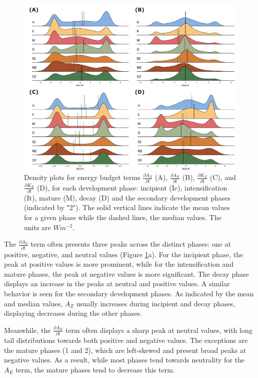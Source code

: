 \begin{figure}[!htbp]
\centering
\includegraphics[width=\textwidth]{figs_5/ridge_plot_Budget Terms.pdf}
\caption[Density Plots - Energy Terms]{Density plots for energy budget terms $\frac{\partial A_Z}{\partial t}$ (A), $\frac{\partial A_E}{\partial t}$ (B), $\frac{\partial K_Z}{\partial t}$ (C), and $\frac{\partial K_E}{\partial t}$ (D), for each development phase: incipient (Ic), intensification (It), mature (M), decay (D) and the secondary development phases (indicated by "2"). The solid vertical lines indicate the mean values for a given phase while the dashed lines, the median values. The units are $W m^{-2}$.}
\label{fig:ridge_plot_Budget}
\end{figure}

The $\frac{\partial A_Z}{\partial t}$ term often presents three peaks across the distinct phases: one at positive, negative, and neutral values (Figure \ref{fig:ridge_plot_Budget}a). For the incipient phase, the peak at positive values is more prominent, while for the intensification and mature phases, the peak at negative values is more significant. The decay phase displays an increase in the peaks at neutral and positive values. A similar behavior is seen for the secondary development phases. As indicated by the mean and median values, $A_Z$ usually increases during incipient and decay phases, displaying decreases during the other phases.

Meanwhile, the $\frac{\partial A_E}{\partial t}$ term often displays a sharp peak at neutral values, with long tail distributions towards both positive and negative values. The exceptions are the mature phases (1 and 2), which are left-skewed and present broad peaks at negative values. As a result, while most phases tend towards neutrality for the $A_E$ term, the mature phases tend to decrease this term.

